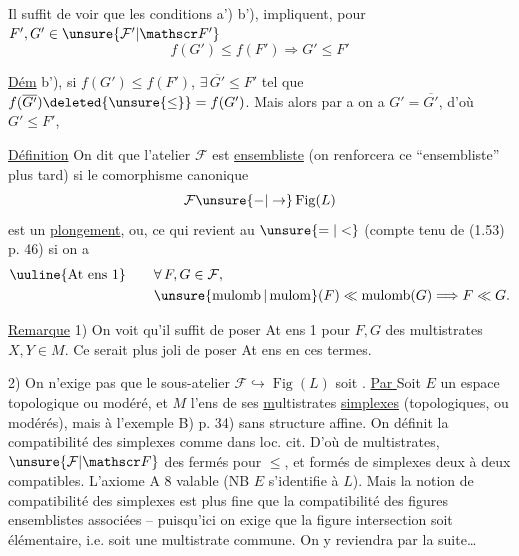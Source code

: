  Il suffit de voir que  les conditions a') b'),  impliquent,  pour $F',G'\in\unsure{\mathcal F'|\mathscr F'}$
\[
f(G')\leq f(F')\Longrightarrow G'\leq F'
\]

\uline{Dém}  b'),  si $f(G')\leq f(F')$, $\exists\,\overline{G'}\leq F'$ tel que $f(\overline{G'})\deleted{\unsure{\leq}}=f(G')$. Mais alors par a on a $G'=\overline{G'}$, d'où $G'\leq F'$, 

\uline{Définition} On dit que l'atelier $\mathcal F$  est   \uline{ensembliste} (on renforcera ce ``ensembliste'' plus tard) si le comorphisme canonique
\[
\mathcal F\unsure{-|\to}\operatorname{Fig}(L)
\]
est un \uline{plongement}, ou, ce qui revient au $\unsure{=|<}$ (compte tenu de (1.53) p. 46) si on a
\[
\begin{aligned}
\text{\uuline{At ens 1}}\qquad &\forall\, F,G\in\mathcal F,\\
&\unsure{\operatorname{mulomb}|\operatorname{mulom}}(F)\ll\operatorname{mulomb}(G)\Longrightarrow F\ll G.
\end{aligned}
\]

\uline{Remarque} 1) On voit qu'il suffit de poser At ens 1 pour $F,G$ des multistrates $X,Y\in M$. Ce serait plus joli de poser At ens en ces termes.

2) On n'exige pas que le sous-atelier $\mathcal F\hookrightarrow\operatorname{Fig}(L)$ soit . \uline{Par }    Soit $E$ un espace topologique ou modéré, et $M$ l'ens de ses \uline{m}ultistrates \uline{simplexes} (topologiques, ou modérés), mais
 à l'exemple B) p. 34) sans structure affine. On définit la compatibilité des simplexes comme dans loc. cit. 
D'où  de multistrates,  $\unsure{\mathcal F|\mathscr F}$  des  fermés pour $\leq$, et formés de simplexes deux à deux compatibles. L'axiome A 8  valable (NB $E$ s'identifie à $L$). Mais la notion de compatibilité des simplexes est plus fine que la compatibilité des figures ensemblistes associées -- puisqu'ici on exige  que la figure intersection soit élémentaire, i.e. soit une multistrate commune. On y reviendra par la suite\ldots

